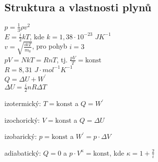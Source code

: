 \documentclass{article}
\begin{document}
\subsection*{Struktura a vlastnosti plynů}
\begin{multicols}{2}
\noindent$p=\frac{1}{3}\rho v^2$\\
$E=\frac{i}{2}kT$, kde $k=1,38\cdot 10^{-23}$ $JK^{-1}$\\
$v=\sqrt{\frac{ikT}{m_0}}$, pro pohyb $i=3$\\
$pV=NkT=RnT$, tj. $\frac{pV}{T}=\textrm{konst}$\\
$R = 8,31$ $J\cdot mol ^{-1}K^{-1}$\\
$Q=\Delta U+W^\prime$\\
$\Delta U=\frac{i}{2}nR\Delta T$
\end{multicols}
\begin{multicols}{}
    \begin{description}
        \vspace{-0.5em}
        \setlength\itemsep{0.1em}
        \item[$i.$] izotermický: $T=\textrm{konst}$ a $Q=W^\prime$
        \item[$ii.$] izochorický: $V=\textrm{konst}$ a $Q=\Delta U$
        \item[$iii.$] izobarický: $p=\textrm{konst}$ a $W^\prime = p\cdot \Delta V$
        \item[$iv.$] adiabatický: $Q=0$ a $p\cdot V^\kappa = \textrm{konst}$, kde $\kappa = 1+\frac{2}{i}$
    \end{description}
\end{multicols}
\end{document}
